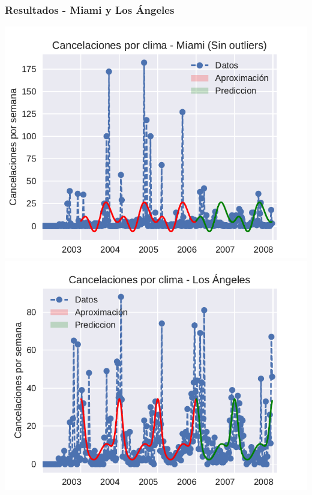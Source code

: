 \documentclass{beamer}
\begin{document}

\begin{frame}

\frametitle{Resultados - Miami y Los Ángeles}


{\centering
\includegraphics[scale=0.487]{diapos/imagenes/cancelacionesClimaMiamiPrediccionV1SINOUTS.pdf}
\includegraphics[scale=0.5]{diapos/imagenes/cancelacionesClimaLosAngelesPrediccionV1.pdf}
}

\end{frame}
\end{document}
